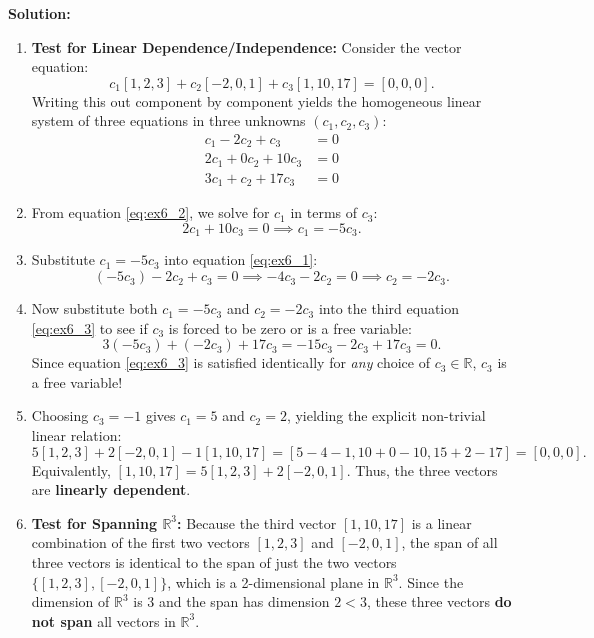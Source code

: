 \documentclass[11pt,a4paper]{article}
\begin{document}
\textbf{Solution:}
\begin{enumerate}
    \item \textbf{Test for Linear Dependence/Independence:}
    Consider the vector equation:
    \[
        c_1[1, 2, 3] + c_2[-2, 0, 1] + c_3[1, 10, 17] = [0, 0, 0].
    \]
    Writing this out component by component yields the homogeneous linear system of three equations in three unknowns $(c_1, c_2, c_3)$:
    \begin{align}
        c_1 - 2c_2 + c_3 &= 0 \label{eq:ex6_1} \\
        2c_1 + 0c_2 + 10c_3 &= 0 \label{eq:ex6_2} \\
        3c_1 + c_2 + 17c_3 &= 0 \label{eq:ex6_3}
    \end{align}
    \item From equation \eqref{eq:ex6_2}, we solve for $c_1$ in terms of $c_3$:
    \[
        2c_1 + 10c_3 = 0 \implies c_1 = -5c_3.
    \]
    \item Substitute $c_1 = -5c_3$ into equation \eqref{eq:ex6_1}:
    \[
        (-5c_3) - 2c_2 + c_3 = 0 \implies -4c_3 - 2c_2 = 0 \implies c_2 = -2c_3.
    \]
    \item Now substitute both $c_1 = -5c_3$ and $c_2 = -2c_3$ into the third equation \eqref{eq:ex6_3} to see if $c_3$ is forced to be zero or is a free variable:
    \[
        3(-5c_3) + (-2c_3) + 17c_3 = -15c_3 - 2c_3 + 17c_3 = 0.
    \]
    Since equation \eqref{eq:ex6_3} is satisfied identically for \emph{any} choice of $c_3 \in \mathbb{R}$, $c_3$ is a free variable!
    \item Choosing $c_3 = -1$ gives $c_1 = 5$ and $c_2 = 2$, yielding the explicit non-trivial linear relation:
    \[
        5[1, 2, 3] + 2[-2, 0, 1] - 1[1, 10, 17] = [5 - 4 - 1, 10 + 0 - 10, 15 + 2 - 17] = [0, 0, 0].
    \]
    Equivalently, $[1, 10, 17] = 5[1, 2, 3] + 2[-2, 0, 1]$. Thus, the three vectors are \textbf{linearly dependent}.

    \item \textbf{Test for Spanning $\mathbb{R}^3$:}
    Because the third vector $[1, 10, 17]$ is a linear combination of the first two vectors $[1, 2, 3]$ and $[-2, 0, 1]$, the span of all three vectors is identical to the span of just the two vectors $\{[1, 2, 3], [-2, 0, 1]\}$, which is a 2-dimensional plane in $\mathbb{R}^3$. Since the dimension of $\mathbb{R}^3$ is $3$ and the span has dimension $2 < 3$, these three vectors \textbf{do not span} all vectors in $\mathbb{R}^3$.
\end{enumerate}
\end{document}

